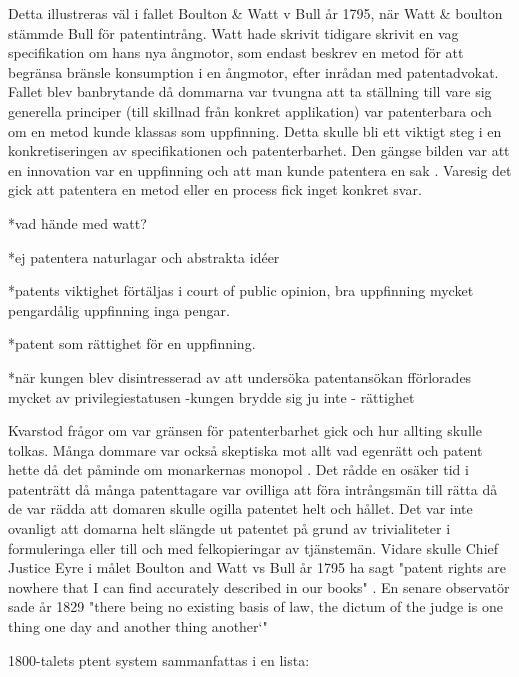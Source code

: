 Detta illustreras väl i fallet Boulton \& Watt v Bull år 1795, när Watt \& boulton stämmde Bull för patentintrång. Watt hade skrivit tidigare skrivit en vag specifikation om hans nya ångmotor, som endast beskrev en metod för att begränsa bränsle konsumption i en ångmotor, efter inrådan med patentadvokat\cite{bracha}. Fallet blev banbrytande då dommarna var tvungna att ta ställning till vare sig generella principer (till skillnad från konkret applikation) var patenterbara och om en metod kunde klassas som uppfinning\cite{bracha}. Detta skulle bli ett viktigt steg i en konkretiseringen av specifikationen och patenterbarhet. Den gängse bilden var att en innovation var en uppfinning och att man kunde patentera en sak \cite{bracha}. Varesig det gick att patentera en metod eller en process fick inget konkret svar.

*vad hände med watt?

*ej patentera naturlagar och abstrakta idéer 

*patents viktighet förtäljas i court of public opinion, bra uppfinning mycket pengardålig uppfinning inga pengar.

*patent som rättighet för en uppfinning.

*när kungen blev disintresserad av att undersöka patentansökan fförlorades mycket av privilegiestatusen -kungen brydde sig ju inte - rättighet


Kvarstod frågor om var gränsen för patenterbarhet gick och hur allting skulle tolkas\cite{bracha}. Många dommare var också skeptiska mot allt vad egenrätt och patent hette då det påminde om monarkernas monopol \cite{macleod}.
Det rådde en osäker tid i patenträtt då många patenttagare var ovilliga att föra intrångsmän till
rätta då de var rädda att domaren skulle ogilla patentet helt och hållet. Det var inte ovanligt att
domarna helt slängde ut patentet på grund av trivialiteter i formuleringa eller till och med
felkopieringar av tjänstemän\cite{macleod}. Vidare skulle Chief Justice Eyre i målet Boulton and Watt vs Bull år 1795 ha sagt "patent rights are nowhere that I can find accurately described in our books" \cite{macleod}. En senare observatör sade år 1829 "there being no existing basis of law, the dictum of the judge is 
one thing one day and another thing another‘" \cite{macleod}

1800-talets ptent system sammanfattas i en lista:

